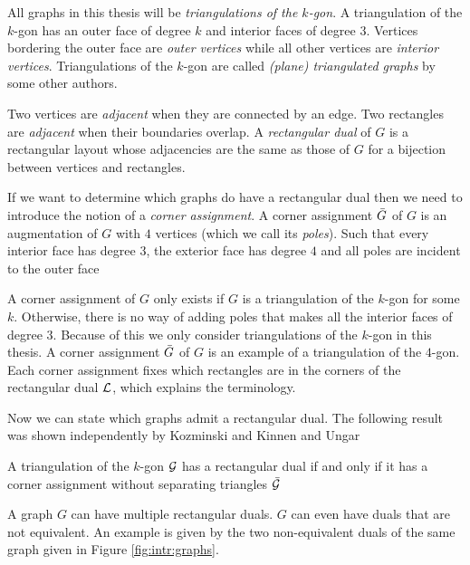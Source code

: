   All graphs in this thesis will be \emph{triangulations of the $k$-gon}. A triangulation of the $k$-gon has an outer face of degree $k$ and interior faces of degree $3$.
  Vertices bordering the outer face are \emph{outer vertices} while all other vertices are \emph{interior vertices}.
  Triangulations of the $k$-gon are called \emph{(plane) triangulated graphs} by some other authors.

  Two vertices are \emph{adjacent} when they are connected by an edge. Two rectangles are \emph{adjacent} when their boundaries overlap. A \emph{rectangular dual} of $G$ is a rectangular layout whose adjacencies are the same as those of $G$ for a bijection between vertices and rectangles.

  If we want to determine which graphs do have a rectangular dual then we need to introduce the notion of a \emph{corner assignment}.
  A corner assignment $\bar{G}$ of $G$ is an augmentation of $G$ with $4$ vertices (which we call its \emph{poles}). Such that every interior face has degree $3$, the exterior face has degree $4$ and all poles are incident to the outer face

  A corner assignment of $G$ only exists if $G$ is a triangulation of the $k$-gon for some $k$. Otherwise, there is no way of adding poles that makes all the interior faces of degree $3$. Because of this we only consider triangulations of the $k$-gon in this thesis. A corner assignment $\bar{G}$ of $G$ is an example of a triangulation of the $4$-gon. Each corner assignment fixes which rectangles are in the corners of the rectangular dual $\mathcal{L}$, which explains the terminology.


  Now we can state which graphs admit a rectangular dual. The following result was shown independently by Kozminski and Kinnen \cite{Kozminski1984} and Ungar \cite{Ungar1953}

  \begin{thrm}
    \label{th:rect:exsitenceREctangularDual}
    A triangulation of the $k$-gon $\mathcal{G}$ has a rectangular dual if and only if it has a corner assignment without separating triangles $\bar{\mathcal{G}}$
  \end{thrm}

  A graph $G$ can have multiple rectangular duals. $G$ can even have duals that are not equivalent. An example is given by the two non-equivalent duals of the same graph given in Figure \ref{fig:intr:graphs}.

